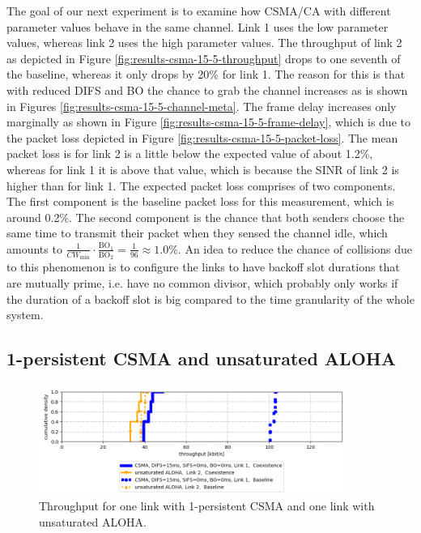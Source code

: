 The goal of our next experiment is to examine how CSMA/CA with different parameter values behave in the same channel. Link 1 uses the low parameter values, whereas link 2 uses the high parameter values. The throughput of link 2 as depicted in Figure \ref{fig:results-csma-15-5-throughput} drops to one seventh of the baseline, whereas it only drops by 20\% for link 1. The reason for this is that with reduced DIFS and BO the chance to grab the channel increases as is shown in Figures \ref{fig:results-csma-15-5-channel-meta}. The frame delay increases only marginally as shown in Figure \ref{fig:results-csma-15-5-frame-delay}, which is due to the packet loss depicted in Figure \ref{fig:results-csma-15-5-packet-loss}. The mean packet loss is for link 2 is a little below the expected value of about 1.2\%, whereas for link 1 it is above that value, which is because the SINR of link 2 is higher than for link 1. The expected packet loss comprises of two components. The first component is the baseline packet loss for this measurement, which is around 0.2\%. The second component is the chance that both senders choose the same time to transmit their packet when they sensed the channel idle, which amounts to $ \frac{1}{CW_\text{min}} \cdot \frac{\text{BO}_1}{\text{BO}_2} = \frac{1}{96} \approx 1.0\% $. An idea to reduce the chance of collisions due to this phenomenon is to configure the links to have backoff slot durations that are mutually prime, i.e. have no common divisor, which probably only works if the duration of a backoff slot is big compared to the time granularity of the whole system. 

\clearpage

\subsection{1-persistent CSMA and unsaturated ALOHA}

\begin{figure}[tb]
	\label{fig:results-difs-only-aloha-throughput}
	\begin{center}
		\includegraphics[width=0.9\textwidth]{pictures/results/different_combinations/difs_only_aloha/throughput_cdf}
	\end{center}
	\caption{Throughput for one link with 1-persistent CSMA and one link with unsaturated ALOHA.}
\end{figure}

